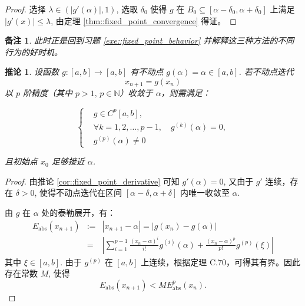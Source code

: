 \documentclass[a4paper]{ctexart}
\newtheorem{remark}{备注}
\newtheorem{corollary}[theorem]{推论}
\numberwithin{theorem}{section}
\numberwithin{equation}{section}
\numberwithin{figure}{section}
\numberwithin{remark}{section}
\begin{document}
\begin{proof}
选择 \( \lambda \in (|g'(\alpha)|, 1) \), 选取 \( \delta_0 \) 使得 \( g \) 在 \( B_0 \subseteq [\alpha - \delta_0, \alpha + \delta_0] \) 
上满足 \( |g'(x)| \leq \lambda \), 由定理 \ref{thm::fixed_point_convergence} 得证。
\end{proof}

\begin{remark}
此时正是回到习题 \ref{exe::fixed_point_behavior} 并解释这三种方法的不同行为的好时机。
\end{remark}



\begin{corollary}
    \label{cor::fixed_point_higher_order}
设函数 \( g : [a, b] \to [a, b] \) 有不动点 \( g(\alpha) = \alpha \in [a, b] \). 若不动点迭代
\begin{equation}
x_{n+1} = g(x_n)
\end{equation}
以 \( p \) 阶精度（其中 \( p > 1,\, p \in \mathbb{N} \)）收敛于 \(\alpha\)，则需满足：

\begin{equation}
\left\{
\begin{aligned}
&g \in C^p[a, b], \\
&\forall k = 1, 2, \ldots, p - 1,\quad g^{(k)}(\alpha) = 0, \\
&g^{(p)}(\alpha) \ne 0
\end{aligned}
\right.
\end{equation}

且初始点 \( x_0 \) 足够接近 \(\alpha\).
\end{corollary}

\begin{proof}
由推论 \ref{cor::fixed_point_derivative} 可知 \( g'(\alpha) = 0 \), 又由于 \( g' \) 连续，存在 \( \delta > 0 \), 
使得不动点迭代在区间 \( [\alpha - \delta, \alpha + \delta] \) 内唯一收敛至 \(\alpha\).

由 \( g \) 在 \(\alpha\) 处的泰勒展开，有：
\begin{equation*}
\begin{array}{rcl}
    E_{\text{abs}}(x_{n+1}) &:=& |x_{n+1} - \alpha| = |g(x_n) - g(\alpha)| \\
&=& \left| \sum_{i=1}^{p-1} \frac{(x_n - \alpha)^i}{i!} g^{(i)}(\alpha) + \frac{(x_n - \alpha)^p}{p!} g^{(p)}(\xi) \right|
\end{array}
\end{equation*}
其中 \( \xi \in [a, b] \). 由于 \( g^{(p)} \) 在 \([a, b]\) 上连续，根据定理 C.70，可得其有界。因此存在常数 \( M \), 使得
\begin{equation}
E_{\text{abs}}(x_{n+1}) < M E_{\text{abs}}^p(x_n).
\end{equation}
\end{proof}
\end{document}
